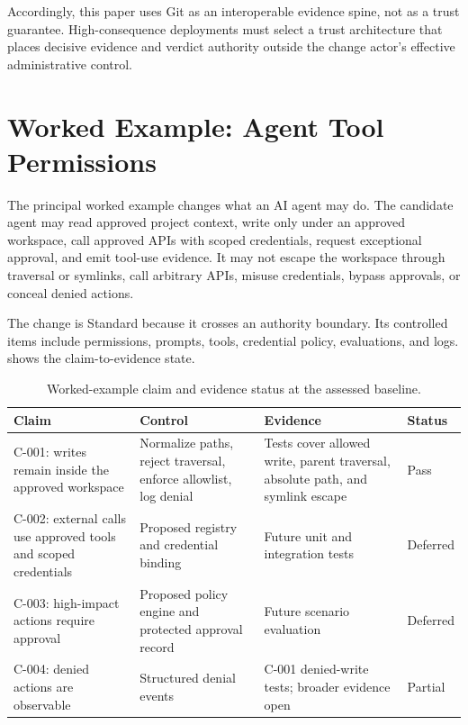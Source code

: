 \documentclass[11pt]{article}
\begin{document}
Accordingly, this paper uses Git as an interoperable evidence spine, not as a trust guarantee. High-consequence deployments must select a trust architecture that places decisive evidence and verdict authority outside the change actor's effective administrative control.

\section{Worked Example: Agent Tool Permissions}
\label{sec:example}

The principal worked example changes what an AI agent may do. The candidate agent may read approved project context, write only under an approved workspace, call approved APIs with scoped credentials, request exceptional approval, and emit tool-use evidence. It may not escape the workspace through traversal or symlinks, call arbitrary APIs, misuse credentials, bypass approvals, or conceal denied actions.

The change is Standard because it crosses an authority boundary. Its controlled items include permissions, prompts, tools, credential policy, evaluations, and logs.  shows the claim-to-evidence state.

\begin{table}[t]
\centering
\caption{Worked-example claim and evidence status at the assessed baseline.}
\label{tab:claims}
\small
\begin{tabularx}{\textwidth}{>{\raggedright\arraybackslash}p{} >{\raggedright\arraybackslash}p{} X >{\raggedright\arraybackslash}p{}}
\toprule
Claim & Control & Evidence & Status \\
\midrule
C-001: writes remain inside the approved workspace & Normalize paths, reject traversal, enforce allowlist, log denial & Tests cover allowed write, parent traversal, absolute path, and symlink escape & Pass \\
C-002: external calls use approved tools and scoped credentials & Proposed registry and credential binding & Future unit and integration tests & Deferred \\
C-003: high-impact actions require approval & Proposed policy engine and protected approval record & Future scenario evaluation & Deferred \\
C-004: denied actions are observable & Structured denial events & C-001 denied-write tests; broader evidence open & Partial \\
\bottomrule
\end{tabularx}
\end{table}
\end{document}
